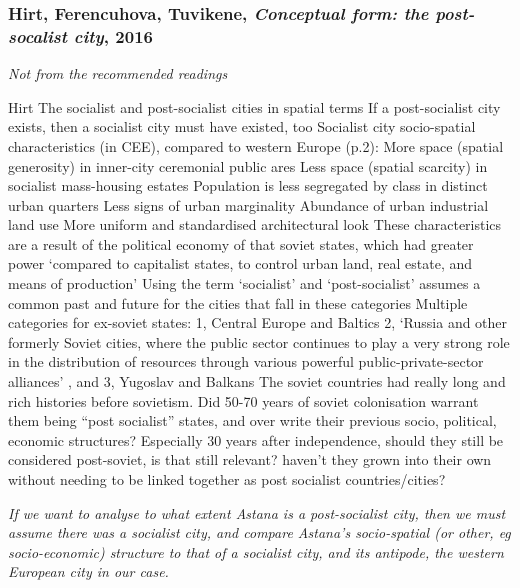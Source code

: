 \documentclass{article}
\begin{document}
\subsubsection{Hirt, Ferencuhova, Tuvikene, \textit{Conceptual form: the post-socalist city}, 2016}\cite{hirt2016conceptual}
\textit{Not from the recommended readings}

\begin{outline}
	\1 Hirt
		\2 The socialist and post-socialist cities in spatial terms
		\2 If a post-socialist city exists, then a socialist city must have existed, too
		\2 Socialist city socio-spatial characteristics (in CEE), compared to western Europe (p.2):
			\3 More space (spatial generosity) in inner-city ceremonial public ares
			\3 Less space (spatial scarcity) in socialist mass-housing estates
			\3 Population is less segregated by class in distinct urban quarters
			\3 Less signs of urban marginality
			\3 Abundance of urban industrial land use
			\3 More uniform and standardised architectural look
		\2 These characteristics are a result of the political economy of that soviet states, which had greater power `compared to capitalist states, to control urban land, real estate, and means of production'
		\2 Using the term `socialist' and `post-socialist' assumes a common past and future for the cities that fall in these categories
		\2 Multiple categories for ex-soviet states: 1, Central Europe and Baltics 2, `Russia and other formerly Soviet cities, where the public sector continues to play a very strong role in the distribution of resources through various powerful public-private-sector alliances' , and 3, Yugoslav and Balkans 
		\2 The soviet countries had really long and rich histories before sovietism. Did 50-70 years of soviet colonisation warrant them being ``post socialist'' states, and over write their previous socio, political, economic structures? Especially 30 years after independence, should they still be considered post-soviet, is that still relevant? haven't they grown into their own without needing to be linked together as post socialist countries/cities?
		\2
\end{outline}

\textit{If we want to analyse to what extent Astana is a post-socialist city, then we must assume there was a socialist city, and compare Astana's socio-spatial (or other, eg socio-economic) structure to that of a socialist city, and its antipode, the western European city in our case.}
\end{document}
